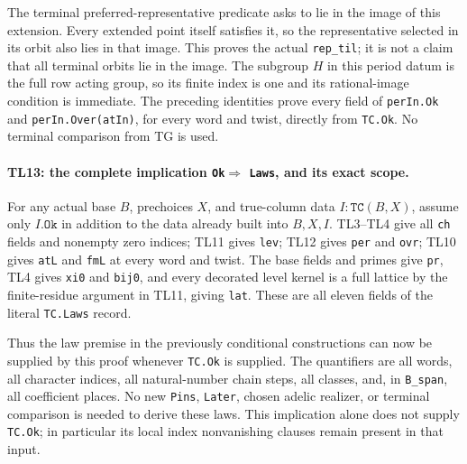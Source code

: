 \documentclass[11pt,a4paper]{article}
\numberwithin{equation}{section}
\theoremstyle{remark}\newtheorem{remark}[theorem]{Remark}
\begin{document}
The terminal preferred-representative predicate asks to lie in the
image of this extension. Every extended point itself satisfies it,
so the representative selected in its orbit also lies in that image.
This proves the actual \texttt{rep\_\allowbreak til}; it is not a claim that
all terminal orbits lie in the image. The subgroup $H$ in this
period datum is the full row acting group, so its finite index is
one and its rational-image condition is immediate.
The preceding identities prove every field of \texttt{perIn.Ok}
and \texttt{perIn.Over(atIn)}, for every word and twist, directly
from \texttt{TC.Ok}. No terminal comparison from TG is used.

\paragraph{TL13: the complete implication \texttt{Ok}$\Rightarrow$
\texttt{Laws}, and its exact scope.}
For any actual base $B$, prechoices $X$, and true-column data
$I:\texttt{TC}(B,X)$, assume only $I.\texttt{Ok}$ in addition to the
data already built into $B,X,I$. TL3--TL4 give all \texttt{ch} fields
and nonempty zero indices; TL11 gives \texttt{lev}; TL12 gives
\texttt{per} and \texttt{ovr}; TL10 gives \texttt{atL} and
\texttt{fmL} at every word and twist. The base fields and primes
give \texttt{pr}, TL4 gives \texttt{xi0} and \texttt{bij0}, and
every decorated level kernel is a full lattice by the finite-residue
argument in TL11, giving \texttt{lat}. These are all eleven fields
of the literal \texttt{TC.Laws} record.

Thus the law premise in the previously conditional constructions
can now be supplied by this proof whenever \texttt{TC.Ok} is
supplied. The quantifiers are all words, all character indices,
all natural-number chain steps, all classes, and, in
\texttt{B\_\allowbreak span}, all coefficient places. No new \texttt{Pins},
\texttt{Later}, chosen adelic realizer, or terminal comparison is
needed to derive these laws. This implication alone does not supply
\texttt{TC.Ok}; in particular its local index nonvanishing clauses
remain present in that input.
\end{document}
